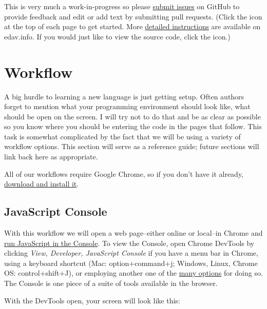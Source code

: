 \documentclass[openany]{book}
\begin{document}
This is very much a work-in-progress so please \href{https://github.com/jtr13/d3book/issues}{submit issues} on GitHub to provide feedback and edit or add text by submitting pull requests. (Click the icon at the top of each page to get started. More \href{https://edav.info/contribute.html\#step-2-click-the-edit-button}{detailed instructions} are available on edav.info. If you would just like to view the source code, click the icon.)

\hypertarget{workflow}{%
\section{Workflow}\label{workflow}}

A big hurdle to learning a new language is just getting setup. Often authors forget to mention what your programming environment should look like, what should be open on the screen. I will try not to do that and be as clear as possible so you know where you should be entering the code in the pages that follow. This task is somewhat complicated by the fact that we will be using a variety of workflow options. This section will serve as a reference guide; future sections will link back here as appropriate.

All of our workflows require Google Chrome, so if you don't have it already, \href{https://www.google.com/chrome/}{download and install it}.

\hypertarget{javascript-console}{%
\subsection{JavaScript Console}\label{javascript-console}}

With this workflow we will open a web page--either online or local--in Chrome and \href{https://developers.google.com/web/tools/chrome-devtools/console/javascript}{run JavaScript in the Console}. To view the Console, open Chrome DevTools by clicking \emph{View, Developer, JavaScript Console} if you have a menu bar in Chrome, using a keyboard shortcut (Mac: option+command+j; Windows, Linux, Chrome OS: control+shift+J), or employing another one of the \href{https://developers.google.com/web/tools/chrome-devtools/open}{many options} for doing so. The Console is one piece of a suite of tools available in the browser.

With the DevTools open, your screen will look like this:
\end{document}
